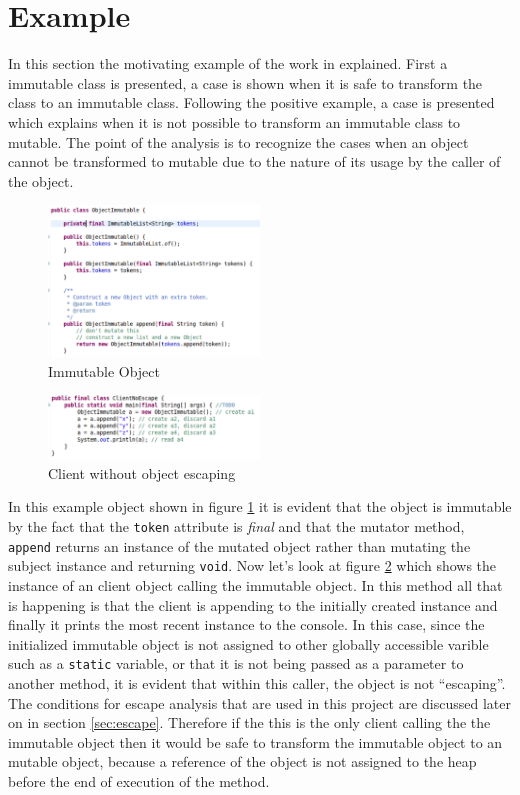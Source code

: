 \section{Example}\label{sec:example}
In this section the motivating example of the work in explained. First a immutable class is presented, a case is shown when it is safe to transform the class to an immutable class. Following the positive example, a case is presented which explains when it is not possible to transform an immutable class to mutable. The point of the analysis is to recognize the cases when an object cannot be transformed to mutable due to the nature of its usage by the caller of the object.

\begin{figure}[H]
	\caption{Immutable Object} \label{fig:immutable_object}
	\includegraphics[width=0.5\textwidth]{img/immutable_object}
\end{figure}

\begin{figure}[H]
	\caption{Client without object escaping} \label{fig:clientNoEscape}
	\includegraphics[width=0.5\textwidth]{img/client_noescape}
\end{figure}

In this example object shown in figure \ref{fig:immutable_object} it is evident that the object is immutable by the fact that the \texttt{token} attribute is \textit{final} and that the mutator method, \texttt{append\(\)} returns an instance of the mutated object rather than mutating the subject instance and returning \texttt{void}. Now let's look at figure \ref{fig:clientNoEscape} which shows the instance of an client object calling the immutable object. In this method all that is happening is that the client is appending to the initially created instance and finally it prints the most recent instance to the console. In this case, since the initialized immutable object is not assigned to other globally accessible varible such as a \texttt{static} variable, or that it is not being passed as a parameter to another method, it is evident that within this caller, the object is not ``escaping''. The conditions for escape analysis that are used in this project are discussed later on in section \ref{sec:escape}.
Therefore if the this is the only client calling the the immutable object then it would be safe to transform the immutable object to an mutable object, because a reference of the object is not assigned to the heap before the end of execution of the method.

